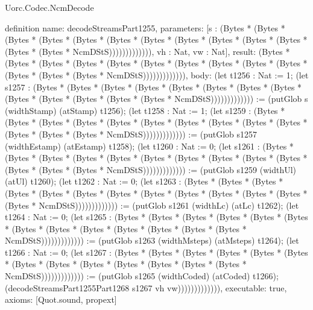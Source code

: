 \begin{lexlean}{Uorc.Codec.NcmDecode}
\begin{semanticmodule}
definition{
  name: decodeStreamsPart1255,
  parameters: [s : (Bytes * (Bytes * (Bytes * (Bytes * (Bytes * (Bytes * (Bytes * (Bytes * (Bytes * (Bytes * (Bytes * (Bytes * (Bytes * NcmDStS))))))))))))), vh : Nat, vw : Nat],
  result: (Bytes * (Bytes * (Bytes * (Bytes * (Bytes * (Bytes * (Bytes * (Bytes * (Bytes * (Bytes * (Bytes * (Bytes * (Bytes * NcmDStS))))))))))))),
  body: (let t1256 : Nat := 1; (let s1257 : (Bytes * (Bytes * (Bytes * (Bytes * (Bytes * (Bytes * (Bytes * (Bytes * (Bytes * (Bytes * (Bytes * (Bytes * (Bytes * NcmDStS))))))))))))) := (putGlob s (widthStamp) (atStamp) t1256); (let t1258 : Nat := 1; (let s1259 : (Bytes * (Bytes * (Bytes * (Bytes * (Bytes * (Bytes * (Bytes * (Bytes * (Bytes * (Bytes * (Bytes * (Bytes * (Bytes * NcmDStS))))))))))))) := (putGlob s1257 (widthEstamp) (atEstamp) t1258); (let t1260 : Nat := 0; (let s1261 : (Bytes * (Bytes * (Bytes * (Bytes * (Bytes * (Bytes * (Bytes * (Bytes * (Bytes * (Bytes * (Bytes * (Bytes * (Bytes * NcmDStS))))))))))))) := (putGlob s1259 (widthUl) (atUl) t1260); (let t1262 : Nat := 0; (let s1263 : (Bytes * (Bytes * (Bytes * (Bytes * (Bytes * (Bytes * (Bytes * (Bytes * (Bytes * (Bytes * (Bytes * (Bytes * (Bytes * NcmDStS))))))))))))) := (putGlob s1261 (widthLc) (atLc) t1262); (let t1264 : Nat := 0; (let s1265 : (Bytes * (Bytes * (Bytes * (Bytes * (Bytes * (Bytes * (Bytes * (Bytes * (Bytes * (Bytes * (Bytes * (Bytes * (Bytes * NcmDStS))))))))))))) := (putGlob s1263 (widthMsteps) (atMsteps) t1264); (let t1266 : Nat := 0; (let s1267 : (Bytes * (Bytes * (Bytes * (Bytes * (Bytes * (Bytes * (Bytes * (Bytes * (Bytes * (Bytes * (Bytes * (Bytes * (Bytes * NcmDStS))))))))))))) := (putGlob s1265 (widthCoded) (atCoded) t1266); (decodeStreamsPart1255Part1268 s1267 vh vw))))))))))))),
  executable: true,
  axioms: [Quot.sound, propext]
}


\end{semanticmodule}
\end{lexlean}
